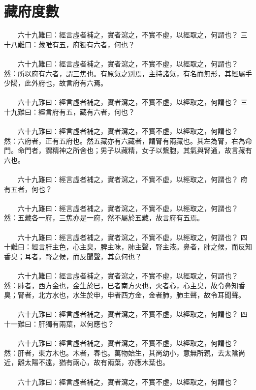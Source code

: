 \section{藏府度數}

　　六十九難曰：經言虛者補之，實者瀉之，不實不虛，以經取之，何謂也？
三十八難曰：藏唯有五，府獨有六者，何也？
\\\\
　　六十九難曰：經言虛者補之，實者瀉之，不實不虛，以經取之，何謂也？
然：所以府有六者，謂三焦也。有原氣之別焉，主持諸氣，有名而無形，其經屬手少陽，此外府也，故言府有六焉。
\\\\
　　六十九難曰：經言虛者補之，實者瀉之，不實不虛，以經取之，何謂也？
三十九難曰：經言府有五，藏有六者，何也？
\\\\
　　六十九難曰：經言虛者補之，實者瀉之，不實不虛，以經取之，何謂也？
然：六府者，正有五府也。然五藏亦有六藏者，謂腎有兩藏也。其左為腎，右為命門。命門者，謂精神之所舍也；男子以藏精，女子以繫胞，其氣與腎通，故言藏有六也。
\\\\
　　六十九難曰：經言虛者補之，實者瀉之，不實不虛，以經取之，何謂也？
府有五者，何也？
\\\\
　　六十九難曰：經言虛者補之，實者瀉之，不實不虛，以經取之，何謂也？
然：五藏各一府，三焦亦是一府，然不屬於五藏，故言府有五焉。
\\\\
　　六十九難曰：經言虛者補之，實者瀉之，不實不虛，以經取之，何謂也？
四十難曰：經言肝主色，心主臭，脾主味，肺主聲，腎主液。鼻者，肺之候，而反知香臭；耳者，腎之候，而反聞聲，其意何也？
\\\\
　　六十九難曰：經言虛者補之，實者瀉之，不實不虛，以經取之，何謂也？
然：肺者，西方金也，金生於巳，巳者南方火也，火者心，心主臭，故令鼻知香臭；腎者，北方水也，水生於申，申者西方金，金者肺，肺主聲，故令耳聞聲。
\\\\
　　六十九難曰：經言虛者補之，實者瀉之，不實不虛，以經取之，何謂也？
四十一難曰：肝獨有兩葉，以何應也？
\\\\
　　六十九難曰：經言虛者補之，實者瀉之，不實不虛，以經取之，何謂也？
然：肝者，東方木也。木者，春也。萬物始生，其尚幼小，意無所親，去太陰尚近，離太陽不遠，猶有兩心，故有兩葉，亦應木葉也。
\\\\
　　六十九難曰：經言虛者補之，實者瀉之，不實不虛，以經取之，何謂也？
